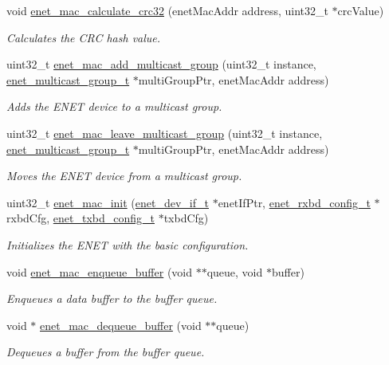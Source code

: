\begin{DoxyCompactItemize}
void \hyperlink{group__enet__driver_ga5ba45abbd16830bdca7d22ced1d2e9b0}{enet\+\_\+mac\+\_\+calculate\+\_\+crc32} (enet\+Mac\+Addr address, uint32\+\_\+t $\ast$crc\+Value)
\begin{DoxyCompactList}\small\item\em Calculates the C\+RC hash value. \end{DoxyCompactList}\item 
uint32\+\_\+t \hyperlink{group__enet__driver_gaa04c775994b30bd49ba80af9b5096126}{enet\+\_\+mac\+\_\+add\+\_\+multicast\+\_\+group} (uint32\+\_\+t instance, \hyperlink{group__enet__driver_ga0f85fe28ec946c36acd9856e9f70799a}{enet\+\_\+multicast\+\_\+group\+\_\+t} $\ast$multi\+Group\+Ptr, enet\+Mac\+Addr address)
\begin{DoxyCompactList}\small\item\em Adds the E\+N\+ET device to a multicast group. \end{DoxyCompactList}\item 
uint32\+\_\+t \hyperlink{group__enet__driver_ga1236f2e0108f1b6e3af003ae5efc9675}{enet\+\_\+mac\+\_\+leave\+\_\+multicast\+\_\+group} (uint32\+\_\+t instance, \hyperlink{group__enet__driver_ga0f85fe28ec946c36acd9856e9f70799a}{enet\+\_\+multicast\+\_\+group\+\_\+t} $\ast$multi\+Group\+Ptr, enet\+Mac\+Addr address)
\begin{DoxyCompactList}\small\item\em Moves the E\+N\+ET device from a multicast group. \end{DoxyCompactList}\item 
uint32\+\_\+t \hyperlink{group__enet__driver_gaefc9401b4c2f7c9169c60921b1e0725b}{enet\+\_\+mac\+\_\+init} (\hyperlink{group__enet__driver_ga497f30fbc93952e93d9fb8cf78480b75}{enet\+\_\+dev\+\_\+if\+\_\+t} $\ast$enet\+If\+Ptr, \hyperlink{group__enet__driver_gab090bee9d2d43fafd258c5cf9db43405}{enet\+\_\+rxbd\+\_\+config\+\_\+t} $\ast$rxbd\+Cfg, \hyperlink{group__enet__driver_gaa9b0e870936a3a951241a0d2d95e22cd}{enet\+\_\+txbd\+\_\+config\+\_\+t} $\ast$txbd\+Cfg)
\begin{DoxyCompactList}\small\item\em Initializes the E\+N\+ET with the basic configuration. \end{DoxyCompactList}\item 
void \hyperlink{group__enet__driver_gaf91fc06ffd12417665373e2e5b77c614}{enet\+\_\+mac\+\_\+enqueue\+\_\+buffer} (void $\ast$$\ast$queue, void $\ast$buffer)
\begin{DoxyCompactList}\small\item\em Enqueues a data buffer to the buffer queue. \end{DoxyCompactList}\item 
void $\ast$ \hyperlink{group__enet__driver_ga81300d523660a5fdecbdc83c047ae142}{enet\+\_\+mac\+\_\+dequeue\+\_\+buffer} (void $\ast$$\ast$queue)
\begin{DoxyCompactList}\small\item\em Dequeues a buffer from the buffer queue. \end{DoxyCompactList}\end{DoxyCompactItemize}


